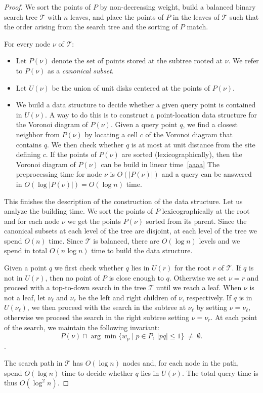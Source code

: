 \documentclass[a4paper,USenglish,numberwithinsect]{lipics}
\newcommand{\T}{\ensuremath{\mathcal{T}}}
\let\le\leqslant
\begin{document}
\begin{proof}
	We sort the points of $P$ by non-decreasing weight, build
	a balanced binary search tree $\T$ with $n$ leaves, and place
	the points of $P$ in the leaves of $\T$ such that the order
	arising from the search tree and the sorting of $P$ match.
	
	For every node $\nu$ of $\T$:
	\begin{itemize}
		\item Let $P(\nu)$ denote the set of points stored at the subtree rooted at $\nu$.
			We refer to $P(\nu)$ as a \emph{canonical subset}.
		\item Let $U(\nu)$ be the union of unit disks centered at the points of $P(\nu)$.
		\item We build a data structure to decide whether a given query point
			is contained in $U(\nu)$. A way to do this is to construct
			a point-location data structure for the Voronoi diagram of $P(\nu)$.
			Given a query point $q$, we find a closest neighbor from $P(\nu)$
			by locating a cell $c$ of the Voronoi diagram that contains $q$.
			We then check whether $q$ is at most at unit distance from the site defining $c$. 
			If the points of $P(\nu)$ are sorted (lexicographically),
			then the Voronoi diagram of $P(\nu)$ can be build in linear time~\ref{aaaa}
			The preprocessing time for node $\nu$ is $O(|P(\nu)|)$ and a
			query can be answered in $O(\log |P(\nu)|)= O(\log n)$ time.
	\end{itemize}
	
	This finishes the description of the construction of the data structure.
	Let us analyze the building time. We sort the points of $P$ 
	lexicographically at the root and for each node $\nu$ 
	we get the points $P(\nu)$ sorted from its parent.
	Since the canonical subsets at each level of the tree are disjoint,
	at each level of the tree we spend $O(n)$ time. 
	Since $\T$ is balanced, there are $O(\log n)$ levels and
	we spend in total $O(n\log n)$ time to build the data structure.
	
	Given a point $q$ we first check whether $q$ lies in $U(r)$ for the root $r$ of $\T$.
	If $q$ is not in $U(r)$, then no point of $P$ is close enough to $q$.
	Otherwise we set $\nu=r$ and proceed with a top-to-down search in the tree $\T$ 
	until we reach a leaf. 
	When $\nu$ is not a leaf, 
	let $\nu_\ell$ and $\nu_r$ be the left and right children of $\nu$, respectively. 
	If $q$ is in $U(\nu_\ell)$, we then proceed with the search in the subtree
	at $\nu_\ell$ by setting $\nu=\nu_\ell$,
	otherwise we proceed the search in the right subtree setting $\nu=\nu_r$.
	At each point of the search, we maintain the following invariant:
	\[	P(\nu) \cap \arg\min \{ w_p \mid p\in P,~|pq|\le 1\} ~\not=~ \emptyset.
	\].
	
	The search path in $\T$ has $O(\log n)$ nodes and, for each node in the path,
	spend $O(\log n)$ time to decide whether $q$ lies in $U(\nu)$. The total
	query time is thus $O(\log^2 n)$.	 
\end{proof}
\end{document}

